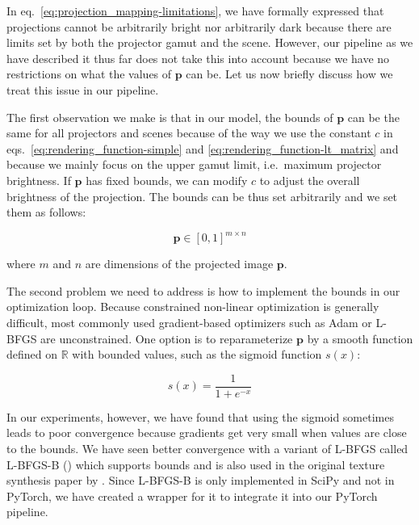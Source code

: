 In eq.~\ref{eq:projection_mapping-limitations}, we have formally expressed that projections cannot be arbitrarily bright nor arbitrarily dark because there are limits set by both the projector gamut and the scene. However, our pipeline as we have described it thus far does not take this into account because we have no restrictions on what the values of \(\bm{p}\) can be. Let us now briefly discuss how we treat this issue in our pipeline.

The first observation we make is that in our model, the bounds of \(\bm{p}\) can be the same for all projectors and scenes because of the way we use the constant \(c\) in eqs.~\ref{eq:rendering_function-simple} and \ref{eq:rendering_function-lt_matrix} and because we mainly focus on the upper gamut limit, i.e.~maximum projector brightness. If \(\bm{p}\) has fixed bounds, we can modify \(c\) to adjust the overall brightness of the projection. The bounds can be thus set arbitrarily and we set them as follows:

\begin{equation}
    \label{eq:optimization_restrictions}
    \bm{p} \in [0, 1]^{m \times n}
\end{equation}

where \(m\) and \(n\) are dimensions of the projected image \(\bm{p}\).

The second problem we need to address is how to implement the bounds in our optimization loop. Because constrained non-linear optimization is generally difficult, most commonly used gradient-based optimizers such as Adam or L-BFGS are unconstrained. One option is to reparameterize \(\bm{p}\) by a smooth function defined on \(\mathbb{R}\) with bounded values, such as the sigmoid function \(s(x)\):

\begin{equation}
    \label{eq:sigmoid}
    s(x) = \frac{1}{1 + e^{-x}}
\end{equation}

In our experiments, however, we have found that using the sigmoid sometimes leads to poor convergence because gradients get very small when values are close to the bounds. We have seen better convergence with a variant of L-BFGS called L-BFGS-B (\citet{Byrd1995}) which supports bounds and is also used in the original texture synthesis paper by \citet{Gatys2015}. Since L-BFGS-B is only implemented in SciPy and not in PyTorch, we have created a wrapper for it to integrate it into our PyTorch pipeline.